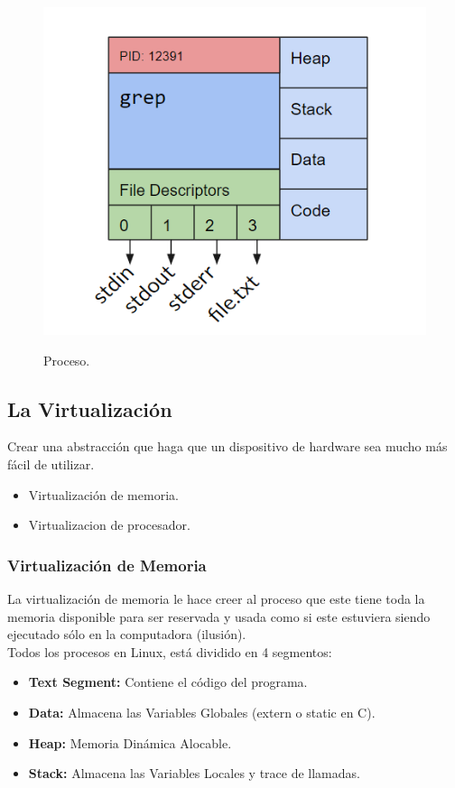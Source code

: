 \documentclass[../main.tex]{subfiles}
\begin{document}
    \begin{figure}[bh]
        \centering
        \includegraphics[scale=0.5]{../images/proceso.png}
        \label{fig:proceso}
        \caption{Proceso.}
    \end{figure}

\subsection{La Virtualización}
    Crear una abstracción que haga que un dispositivo de hardware sea mucho más fácil de utilizar.
    \begin{itemize}
        \item Virtualización de memoria.
        \item Virtualizacion de procesador.
    \end{itemize}

    \subsubsection*{Virtualización de Memoria}
        La virtualización de memoria le hace creer al proceso que este tiene toda la memoria disponible para ser reservada y usada como si este estuviera siendo ejecutado sólo en la computadora (ilusión). \\
        
        Todos los procesos en Linux, está dividido en 4 segmentos:
        \begin{itemize}
            \item \textbf{Text Segment:} Contiene el código del programa.
            \item \textbf{Data:} Almacena las Variables Globales (extern o static en C).
            \item \textbf{Heap:} Memoria Dinámica Alocable.
            \item \textbf{Stack:} Almacena las Variables Locales y trace de llamadas.
        \end{itemize}
\end{document}
